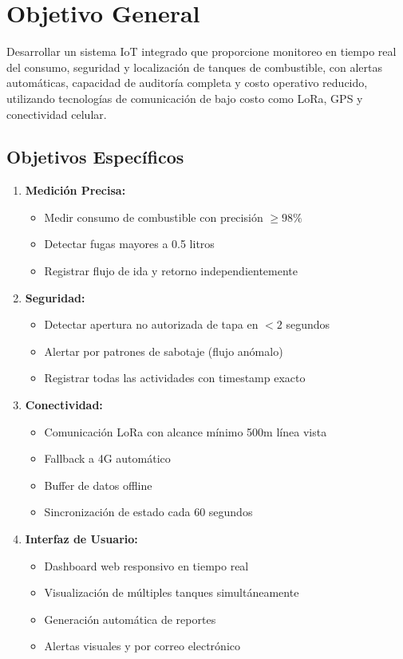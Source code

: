 \documentclass[12pt,a4paper,oneside]{report}
\begin{document}
\chapter{Objetivo General}

Desarrollar un sistema IoT integrado que proporcione monitoreo en tiempo real del consumo, seguridad y localización de tanques de combustible, con alertas automáticas, capacidad de auditoría completa y costo operativo reducido, utilizando tecnologías de comunicación de bajo costo como LoRa, GPS y conectividad celular.

\section{Objetivos Específicos}

\begin{enumerate}
    \item \textbf{Medición Precisa:}
    \begin{itemize}
        \item Medir consumo de combustible con precisión $\geq 98\%$
        \item Detectar fugas mayores a 0.5 litros
        \item Registrar flujo de ida y retorno independientemente
    \end{itemize}
    
    \item \textbf{Seguridad:}
    \begin{itemize}
        \item Detectar apertura no autorizada de tapa en $< 2$ segundos
        \item Alertar por patrones de sabotaje (flujo anómalo)
        \item Registrar todas las actividades con timestamp exacto
    \end{itemize}
    
    \item \textbf{Conectividad:}
    \begin{itemize}
        \item Comunicación LoRa con alcance mínimo 500m línea vista
        \item Fallback a 4G automático
        \item Buffer de datos offline
        \item Sincronización de estado cada 60 segundos
    \end{itemize}
    
    \item \textbf{Interfaz de Usuario:}
    \begin{itemize}
        \item Dashboard web responsivo en tiempo real
        \item Visualización de múltiples tanques simultáneamente
        \item Generación automática de reportes
        \item Alertas visuales y por correo electrónico
    \end{itemize}
    

\end{enumerate}
\end{document}
